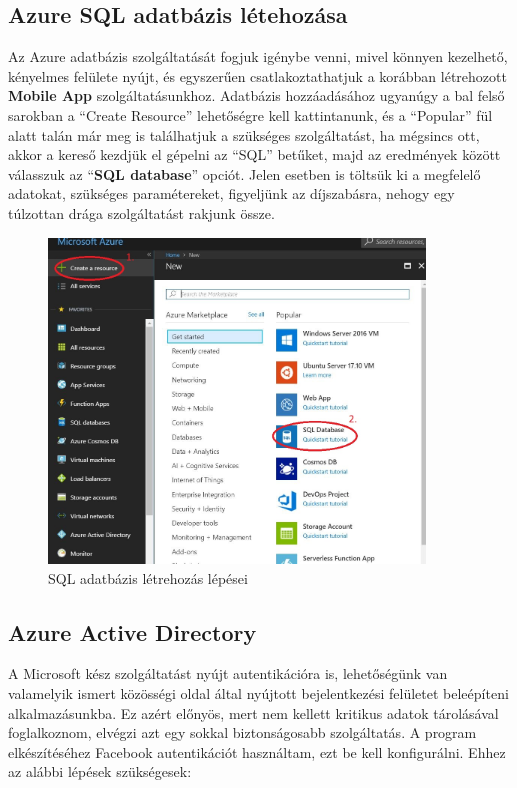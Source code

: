 \documentclass[a4paper,12pt]{report}
\begin{document}
    \subsection{Azure SQL adatbázis létehozása}
    Az Azure adatbázis szolgáltatását fogjuk igénybe venni, mivel könnyen kezelhető, kényelmes felülete nyújt, és egyszerűen
    csatlakoztathatjuk a korábban létrehozott \textbf{Mobile App} szolgáltatásunkhoz.
    Adatbázis hozzáadásához ugyanúgy a bal felső sarokban a ``Create Resource'' lehetőségre kell kattintanunk, és a ``Popular''
    fül alatt talán már meg is találhatjuk a szükséges szolgáltatást, ha mégsincs ott, akkor a kereső kezdjük el gépelni az ``SQL''
    betűket, majd az eredmények között válasszuk az ``\textbf{SQL database}'' opciót.
    Jelen esetben is töltsük ki a megfelelő adatokat, szükséges paramétereket, figyeljünk az díjszabásra, nehogy egy túlzottan drága
    szolgáltatást rakjunk össze.

    \begin{figure}[H]
        \centering
        \includegraphics[width=10cm,keepaspectratio]{images/azuresqldatabase.jpg}
        \caption{SQL adatbázis létrehozás lépései}
        \label{fig: SQLDatabase}
    \end{figure}

    \subsection{Azure Active Directory}
    A Microsoft kész szolgáltatást nyújt autentikációra is, lehetőségünk van valamelyik ismert közösségi oldal által nyújtott
    bejelentkezési felületet beleépíteni alkalmazásunkba. Ez azért előnyös, mert nem kellett kritikus adatok tárolásával foglalkoznom,
    elvégzi azt egy sokkal biztonságosabb szolgáltatás. A program elkészítéséhez Facebook autentikációt használtam, ezt be kell
    konfigurálni.\cite{ActiveDirectory}
    Ehhez az alábbi lépések szükségesek:
\end{document}
